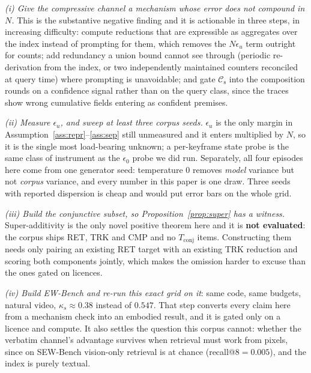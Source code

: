 \documentclass[10pt]{article}
\newcommand{\VkappaS}{0.547}
\theoremstyle{definition}
\theoremstyle{plain}
\newcommand{\cs}{\mathcal{C}_{\mathrm{s}}}
\begin{document}
\emph{(i) Give the compressive channel a mechanism whose error does not compound in $N$.}
This is the substantive negative finding and it is actionable in three steps, in increasing
difficulty: compute reductions that are expressible as aggregates over the index instead of
prompting for them, which removes the $N\epsilon_u$ term outright for counts; add redundancy a
union bound cannot see through (periodic re-derivation from the index, or two independently
maintained counters reconciled at query time) where prompting is unavoidable; and gate $\cs$
into the composition rounds on a confidence signal rather than on the query class, since the
traces show wrong cumulative fields entering as confident premises.

\emph{(ii) Measure $\epsilon_u$, and sweep at least three corpus seeds.} $\epsilon_u$ is the
only margin in Assumption~\ref{ass:repr}--\ref{ass:sep} still unmeasured and it enters
multiplied by $N$, so it is the single most load-bearing unknown; a per-keyframe state probe is
the same class of instrument as the $\epsilon_0$ probe we did run. Separately, all four episodes
here come from one generator seed: temperature $0$ removes \emph{model} variance but not
\emph{corpus} variance, and every number in this paper is one draw. Three seeds with reported
dispersion is cheap and would put error bars on the whole grid.

\emph{(iii) Build the conjunctive subset, so Proposition~\ref{prop:super} has a witness.}
Super-additivity is the only novel positive theorem here and it is \textbf{not evaluated}: the
corpus ships RET, TRK and CMP and no $T_{\mathrm{conj}}$ items. Constructing them needs only
pairing an existing RET target with an existing TRK reduction and scoring both components
jointly, which makes the omission harder to excuse than the ones gated on licences.

\emph{(iv) Build EW-Bench and re-run this exact grid on it}: same code, same budgets, natural
video, $\kappa_s\approx0.38$ instead of $\VkappaS{}$. That step converts every claim here from a
mechanism check into an embodied result, and it is gated only on a licence and compute. It also
settles the question this corpus cannot: whether the verbatim channel's advantage survives when
retrieval must work from pixels, since on SEW-Bench vision-only retrieval is at chance
(recall@$8=0.005$), and the index is purely textual.
\end{document}
